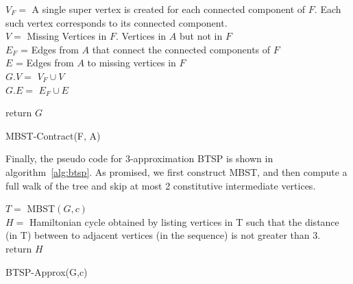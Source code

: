 \documentclass[runningheads, a4paper]{llncs}
\begin{document}
\begin{algorithm}[H]
    
    $V_{F} = $ A single super vertex is created for each connected component of $F$. Each such vertex corresponds to its connected component. \\
    $V = $ Missing Vertices in $F$. Vertices in $A$ but not in $F$ \\
    
    $E_{F}$ = Edges from $A$ that connect the connected components of $F$\\
    $E$ = Edges from $A$ to missing vertices in $F$ \\
    
    $G.V = $ $V_{F} \cup V $ \\
    $G.E = $ $E_{F} \cup E $
    
    return $G$
    
    \caption{MBST-Contract(F, A)}
    \label{alg:mbst_contract}
\end{algorithm}

Finally, the pseudo code for 3-approximation BTSP is shown in algorithm~\ref{alg:btsp}. As promised, we first construct MBST, and then compute a full walk of the tree and skip at most 2 constitutive intermediate vertices.

\begin{algorithm}[H]
    $T = $ MBST$(G,c)$ \\
    
    $H = $ Hamiltonian cycle obtained by listing vertices in T such that the distance (in T) between to adjacent vertices (in the sequence) is not greater than 3. \\
    
    return $H$
    \caption{BTSP-Approx(G,c)}
    \label{alg:btsp}
\end{algorithm}

\end{document}
